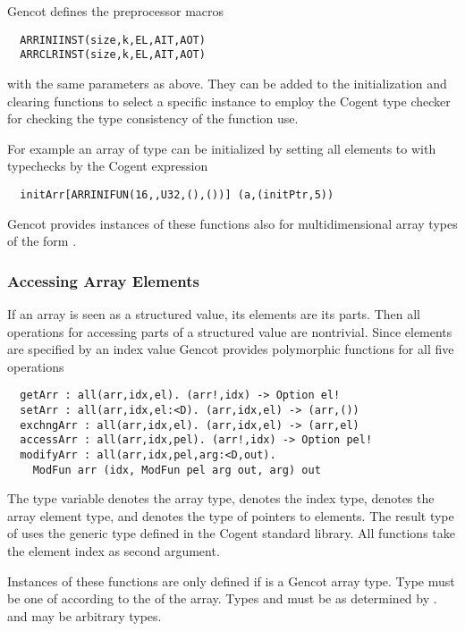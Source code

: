 Gencot defines the preprocessor macros
\begin{verbatim}
  ARRINIINST(size,k,EL,AIT,AOT)
  ARRCLRINST(size,k,EL,AIT,AOT)
\end{verbatim}
with the same parameters as above. They can be added to the initialization and clearing functions to select a specific instance
to employ the Cogent type checker for checking the type consistency of the function use.

For example an array  of type  can be initialized by setting all elements to  with typechecks by 
the Cogent expression
\begin{verbatim}
  initArr[ARRINIFUN(16,,U32,(),())] (a,(initPtr,5))
\end{verbatim}

Gencot provides instances of these functions also for multidimensional array types of the form .

\subsubsection{Accessing Array Elements}

If an array is seen as a structured value, its elements are its parts.
Then all operations for accessing parts of a structured value are nontrivial. Since elements are specified by an index value
Gencot provides polymorphic functions for all five operations
\begin{verbatim}
  getArr : all(arr,idx,el). (arr!,idx) -> Option el!
  setArr : all(arr,idx,el:<D). (arr,idx,el) -> (arr,())
  exchngArr : all(arr,idx,el). (arr,idx,el) -> (arr,el)
  accessArr : all(arr,idx,pel). (arr!,idx) -> Option pel!
  modifyArr : all(arr,idx,pel,arg:<D,out). 
    ModFun arr (idx, ModFun pel arg out, arg) out
\end{verbatim}
The type variable  denotes the array type,  denotes the index type,
 denotes the array element type, and  denotes the type of pointers to elements. 
The result type of  uses the generic type  defined in
the Cogent standard library. All functions take the element index as second argument.

Instances of these functions are only defined if  is a Gencot array type. Type 
must be one of  according to the  of the array. Types  and
 must be as determined by .  and  may be arbitrary types.

